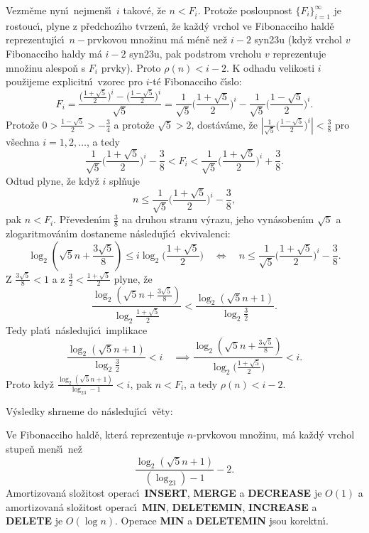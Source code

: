 \flushpar Vezm\v eme nyn\'\i\ nejmen\v s\'\i\ $i$ takov\'e, \v ze $
n<F_i$. Proto\v ze 
posloupnost $\{F_i\}_{i=1}^{\infty}$ je rostouc\'\i , plyne z p\v redchoz\'\i ho 
tvrzen\'\i , \v ze ka\v zd\'y vrchol ve Fibonacciho hald\v e 
reprezentuj\'\i c\'\i\ $n-$prvkovou mno\v zinu m\'a m\'en\v e ne\v z $
i-2$ 
syn\accent23u (kdy\v z vrchol $v$ Fibonacciho haldy m\'a $i-2$ 
syn\accent23u, pak podstrom vrcholu $v$ reprezentuje 
mno\v zinu alespo\v n s $F_i$ prvky). Proto $\rho (n)<i-2$. K odhadu 
velikosti $i$ pou\v zijeme explicitn\'\i\ vzorec 
pro $i$-t\'e Fibonacciho \v c\'\i slo: 
$$F_i=\frac {\big(\frac {1+\sqrt 5}2\big)^i-\big(\frac {1-\sqrt 5}
2\big)^i}{\sqrt 5}=\frac 1{\sqrt 5}\big(\frac {1+\sqrt 5}2\big)^i
-\frac 1{\sqrt 5}\big(\frac {1-\sqrt 5}2\big)^i.$$
Proto\v ze $0>\frac {1-\sqrt 5}2>-\frac 34$ a proto\v ze $\sqrt 5
>2$, dost\'av\'ame, \v ze $|\frac 1{\sqrt 5}\big(\frac {1-\sqrt 5}
2\big)^i|<\frac 38$ pro v\v sechna 
$i=1,2,\dots$, a tedy 
$$\frac 1{\sqrt 5}\big(\frac {1+\sqrt 5}2\big)^i-\frac 38<F_i<\frac 
1{\sqrt 5}\big(\frac {1+\sqrt 5}2\big)^i+\frac 38.$$
Odtud plyne, \v ze kdy\v z $i$ spl\v nuje 
$$n\le\frac 1{\sqrt 5}\big(\frac {1+\sqrt 5}2\big)^i-\frac 38,$$
pak $n<F_i$. 
P\v reveden\'\i m $\frac 38$ na druhou stranu v\'yrazu, jeho 
vyn\'asoben\'\i m $\sqrt 5$ a zlogaritmov\'an\'\i m dostaneme n\'asleduj\'\i c\'\i\ 
ekvivalenci: 
$$\log_2(\sqrt 5n+\frac {3\sqrt 5}8)\le i\log_2\big(\frac {1+\sqrt 
5}2\big)\quad\Leftrightarrow\quad n\le\frac 1{\sqrt 5}\big(\frac {
1+\sqrt 5}2\big)^i-\frac 38.$$
Z $\frac {3\sqrt 5}8<1$ a z $\frac 32<\frac {1+\sqrt 5}2$ plyne, \v ze 
$$\frac {\log_2(\sqrt 5n+\frac {3\sqrt 5}8)}{\log_2\frac {1+\sqrt 
5}2}<\frac {\log_2(\sqrt 5n+1)}{\log_2\frac 32}.$$
Tedy plat\'\i\ n\'asleduj\'\i c\'\i\ implikace
$$\frac {\log_2(\sqrt 5n+1)}{\log_2\frac 32}<i\quad\implies\frac {\log_
2(\sqrt 5n+\frac {3\sqrt 5}8)}{\log_2\big(\frac {1+\sqrt 5}2\big)}
<i.$$
Proto kdy\v z $\frac {\log_2(\sqrt 5n+1)}{\log_23-1}<i$, pak $n<F_
i$, a tedy $\rho (n)<i-2$.
\medskip

\flushpar V\'ysledky shrneme do n\'asleduj\'\i c\'\i\ v\v ety: 
\medskip

Ve Fibonacciho hald\v e, kter\'a   
reprezentuje $n$-prvkovou mno\v zinu, m\'a ka\v zd\'y vrchol 
stu\-pe\v n men\v s\'\i\ ne\v z 
$$\frac {\log_2(\sqrt 5n+1)}{(\log_23)-1}-2.$$
Amortizovan\'a slo\v zitost operac\'\i\ {\bf INSERT}, {\bf MERGE} a {\bf DECREASE }
je $O(1)$ a amortizovan\'a slo\v zitost operac\'\i\ {\bf MIN}, 
{\bf DE\-LE\-TE\-MIN}, {\bf INCREASE} a {\bf DELETE} je $O(\log n
)$. Operace {\bf MIN }
a {\bf DELETEMIN} jsou korektn\'\i .
\endproclaim
\medskip

